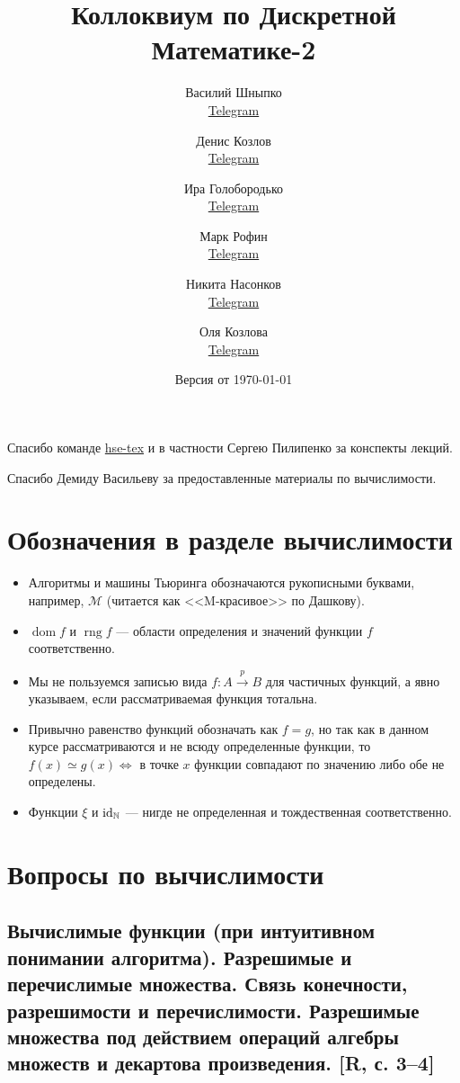 \documentclass[a4paper, fleqn]{article}
\title{Коллоквиум по Дискретной Математике-2}
\author{

    Василий Шныпко       \\ \href{https://t.me/yourvash}{Telegram} \and
    Денис Козлов         \\ \href{https://t.me/DKozl50}{Telegram} \and
    Ира Голобородько     \\ \href{https://t.me/Ira4kgl}{Telegram} \and
    Марк Рофин           \\ \href{https://t.me/Broccoliman}{Telegram} \and
    Никита Насонков      \\ \href{https://t.me/nnv_nick}{Telegram} \and
    Оля Козлова \\ \href{https://t.me/grenlayk}{Telegram}
}
\date{Версия от {\ddmmyyyydate\today} \currenttime}
\DeclareMathOperator{\dom}{\mathop{\mathrm{dom}}}
\DeclareMathOperator{\rng}{\mathop{\mathrm{rng}}}
\begin{document}
    \maketitle

    Спасибо команде \href{https://github.com/hse-tex/hse-tex}{hse-tex} 
    и в частности Сергею Пилипенко за конспекты лекций. 

    Спасибо Демиду Васильеву за предоставленные материалы по вычислимости.

    \tableofcontents

    \newpage

\section{Обозначения в разделе вычислимости}

    \begin{itemize}
        \item Алгоритмы и машины Тьюринга обозначаются рукописными буквами, например, $\mathcal{M}$ (читается как <<M-красивое>> по Дашкову).

        \item $\dom f$ и $\rng f$ --- области определения и значений функции $f$ соответственно.

        \item Мы не пользуемся записью вида $f : A \xrightarrow{p} B$ для частичных функций, а явно указываем, если рассматриваемая функция тотальна.

        \item Привычно равенство функций обозначать как $f = g$, но так как в данном курсе рассматриваются и не всюду определенные функции, то $f(x) \simeq g(x) \iff$ в точке $x$ функции совпадают по значению либо обе не определены.

        \item Функции $\xi$ и $\text{id}_{\mathbb{N}}$ --- нигде не определенная и тождественная соответственно.
    \end{itemize}

\section{Вопросы по вычислимости}

    \subsection{Вычислимые функции (при интуитивном понимании алгоритма). Разрешимые и перечислимые множества. Связь конечности, разрешимости и перечислимости. Разрешимые множества под действием операций алгебры множеств и декартова произведения. [R, с. 3–4]}
\end{document}
